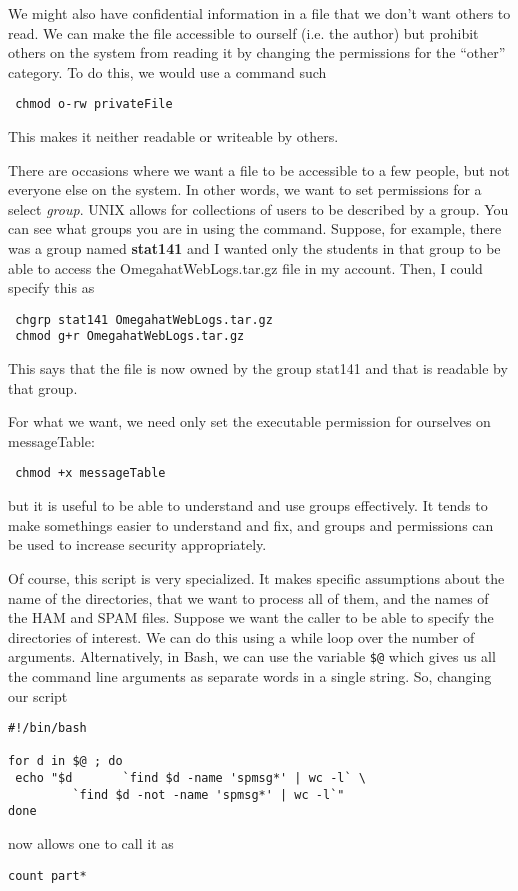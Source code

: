 We might also have confidential information
in a file that we don't want others to read.
We can make the file accessible to ourself
(i.e. the author) but prohibit others on
the system from reading it by changing the permissions
for the ``other'' category.
To do this, we would use a command such
\begin{verbatim}
 chmod o-rw privateFile
\end{verbatim}
This makes it neither readable or writeable by others.

There are occasions where we want a file to be
accessible to a few people, but not everyone else on the system.
In other words, we want to set permissions for a select
\textit{group}.
UNIX allows for collections of users to be described by a
group.  You can see what groups you are in using
the  command.   Suppose, for 
example, there was a group named 
\textbf{stat141} and I wanted only the students in
that group to be able to access the OmegahatWebLogs.tar.gz
file in my account. Then, I could specify this as
\begin{verbatim}
 chgrp stat141 OmegahatWebLogs.tar.gz
 chmod g+r OmegahatWebLogs.tar.gz
\end{verbatim}
This says that the file is now owned by the group stat141
and that is readable by that group.

For what we want, we need only set the executable permission
for ourselves on messageTable:
\begin{verbatim}
 chmod +x messageTable
\end{verbatim}
but  it is useful to be able to understand and use groups
effectively. It tends to make somethings easier
to understand and fix, and groups and permissions can be used
to increase security appropriately.



Of course, this script is very specialized.
It makes specific assumptions about the name of the directories,
that we want to process all of them,  
and the names of the HAM and SPAM files.
Suppose we want the caller to be able to specify
the directories of interest.
We can do this using a while loop over the number of
arguments.
Alternatively,  in Bash, we can use
the variable \verb+$@+ which gives us
all the command line arguments as separate words
in a single string.
So, changing our script
\begin{verbatim}
#!/bin/bash

for d in $@ ; do 
 echo "$d       `find $d -name 'spmsg*' | wc -l` \
         `find $d -not -name 'spmsg*' | wc -l`"
done
\end{verbatim}
now allows one to call it as
\begin{verbatim}
count part*
\end{verbatim}

